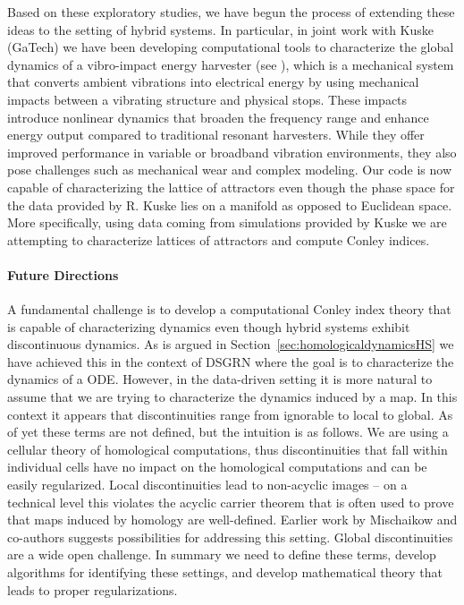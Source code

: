 \documentclass[letterpaper,11pt]{article}
\begin{document}
Based on these exploratory studies, we have begun the process of extending these ideas to the setting of hybrid systems. 
In particular, in joint work with Kuske (GaTech) we have been developing computational tools to characterize the global dynamics of a vibro-impact energy harvester (see \cite{serdukova2021post}), 
which is a mechanical system that converts ambient vibrations into electrical energy by using mechanical impacts between a vibrating structure and physical stops. These impacts introduce nonlinear dynamics that broaden the frequency range and enhance energy output compared to traditional resonant harvesters. While they offer improved performance in variable or broadband vibration environments, they also pose challenges such as mechanical wear and complex modeling.
Our code is now capable of characterizing the lattice of attractors even though the  phase space for the data provided by R. Kuske lies on a manifold as opposed to Euclidean space.
More specifically, using data coming from simulations provided by Kuske we are attempting to characterize lattices of attractors and compute Conley indices. 

\paragraph{Future Directions}

A fundamental challenge is to develop a computational Conley index theory that is capable of characterizing dynamics even though hybrid systems exhibit discontinuous dynamics.
As is argued in Section~\ref{sec:homologicaldynamicsHS} we have achieved this in the context of DSGRN where the goal is to characterize the dynamics of a ODE.
However, in the data-driven setting it is more natural to assume that we are trying to characterize the dynamics induced by a map.
In this context it appears that discontinuities range from ignorable to local to global. 
As of yet these terms are not defined, but the intuition is as follows.
We are using a cellular theory of homological computations, thus discontinuities that fall within individual cells have no impact on the homological computations and can be easily regularized.
Local discontinuities lead to non-acyclic images -- on a technical level this violates the acyclic carrier theorem that is often used to prove that maps induced by homology are well-defined.
Earlier work by Mischaikow and co-authors suggests possibilities for addressing this setting.
Global discontinuities are a wide open challenge.
In summary we need to define these terms, develop algorithms for identifying these settings, and develop mathematical theory that leads to proper regularizations. 
\end{document}

